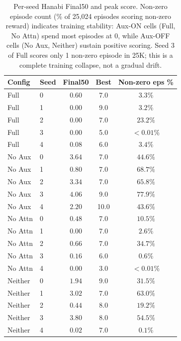 \documentclass{article}
\theoremstyle{plain}
\theoremstyle{definition}
\theoremstyle{remark}
\begin{document}
\begin{table}[H]
\centering
\small
\caption{Per-seed Hanabi Final50 and peak score. Non-zero episode count (\% of 25,024 episodes scoring non-zero reward) indicates training stability: Aux-ON cells (Full, No Attn) spend most episodes at 0, while Aux-OFF cells (No Aux, Neither) sustain positive scoring. Seed 3 of Full scores only 1 non-zero episode in 25K; this is a complete training collapse, not a gradual drift.}
\label{tab:hanabi_perseed}
\setlength{\tabcolsep}{4pt}
\begin{tabular}{llccc}
\toprule
\textbf{Config} & \textbf{Seed} & \textbf{Final50} & \textbf{Best} & \textbf{Non-zero eps \%} \\
\midrule
Full       & 0 & $0.60$ & 7.0 & $3.3\%$ \\
Full       & 1 & $0.00$ & 9.0 & $3.2\%$ \\
Full       & 2 & $0.00$ & 7.0 & $23.2\%$ \\
Full       & 3 & $0.00$ & 5.0 & $<0.01\%$ \\
Full       & 4 & $0.08$ & 6.0 & $3.4\%$ \\
\addlinespace
No Aux     & 0 & $3.64$ & 7.0 & $44.6\%$ \\
No Aux     & 1 & $0.80$ & 7.0 & $68.7\%$ \\
No Aux     & 2 & $3.34$ & 7.0 & $65.8\%$ \\
No Aux     & 3 & $4.06$ & 9.0 & $77.9\%$ \\
No Aux     & 4 & $2.20$ & 10.0 & $43.6\%$ \\
\addlinespace
No Attn    & 0 & $0.48$ & 7.0 & $10.5\%$ \\
No Attn    & 1 & $0.00$ & 7.0 & $2.6\%$ \\
No Attn    & 2 & $0.66$ & 7.0 & $34.7\%$ \\
No Attn    & 3 & $0.16$ & 6.0 & $0.6\%$ \\
No Attn    & 4 & $0.00$ & 3.0 & $<0.01\%$ \\
\addlinespace
Neither    & 0 & $1.94$ & 9.0 & $31.5\%$ \\
Neither    & 1 & $3.02$ & 7.0 & $63.0\%$ \\
Neither    & 2 & $0.44$ & 8.0 & $19.2\%$ \\
Neither    & 3 & $3.80$ & 8.0 & $54.5\%$ \\
Neither    & 4 & $0.02$ & 7.0 & $0.1\%$ \\
\bottomrule
\end{tabular}
\end{table}
\end{document}

